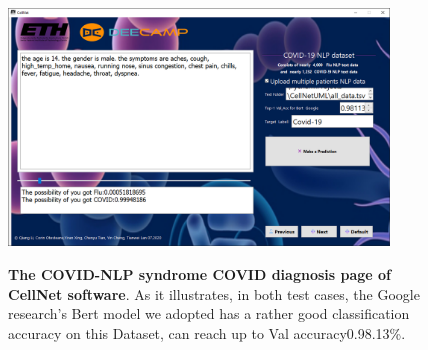 \begin{figure}[t]
\begin{center}
\includegraphics[height=0.3\textheight,width=0.9\textwidth]{thesis-template-master/images/cellnet7-3page.PNG}
\label{fig:cellnet}
\end{center}
\caption{\textbf{The COVID-NLP syndrome COVID diagnosis page of CellNet software}. As it illustrates, in both test cases, the Google research's Bert model we adopted has a rather good classification accuracy on this Dataset, can reach up to Val accuracy0.98.13\%. }
\end{figure}


